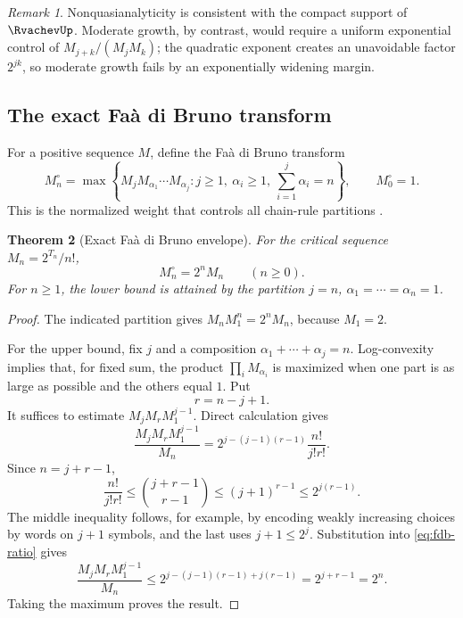 \documentclass[11pt,a4paper]{article}
\newtheorem{theorem}{Theorem}[section]
\theoremstyle{definition}
\theoremstyle{remark}
\newtheorem{remark}[theorem]{Remark}
\begin{document}
\begin{remark}
Nonquasianalyticity is consistent with the compact support of $\RvachevUp$.  Moderate
growth, by contrast, would require a uniform exponential control of
$M_{j+k}/(M_jM_k)$; the quadratic exponent creates an unavoidable factor
$2^{jk}$, so moderate growth fails by an exponentially widening margin.
\end{remark}

\subsection{The exact Fa\`a di Bruno transform}

For a positive sequence $M$, define the Fa\`a di Bruno transform
\begin{equation}
  M_n^\circ=
  \max\left\{
    M_jM_{\alpha_1}\cdots M_{\alpha_j}:
    j\ge1,\ \alpha_i\ge1,\ \sum_{i=1}^j\alpha_i=n
  \right\},
  \qquad M_0^\circ=1.
  \label{eq:fdb-transform-def}
\end{equation}
This is the normalized weight that controls all chain-rule partitions
\cite{RainerSchindl}.

\begin{theorem}[Exact Fa\`a di Bruno envelope]
\label{thm:exact-fdb}
For the critical sequence $M_n=2^{T_n}/n!$,
\begin{equation}
  M_n^\circ=2^nM_n
  \qquad(n\ge0).
  \label{eq:exact-fdb}
\end{equation}
For $n\ge1$, the lower bound is attained by the partition
$j=n$, $\alpha_1=\cdots=\alpha_n=1$.
\end{theorem}

\begin{proof}
The indicated partition gives
$M_nM_1^n=2^nM_n$, because $M_1=2$.

For the upper bound, fix $j$ and a composition
$\alpha_1+\cdots+\alpha_j=n$.  Log-convexity implies that, for fixed sum, the
product $\prod_iM_{\alpha_i}$ is maximized when one part is as large as possible
and the others equal $1$.  Put
\[
  r=n-j+1.
\]
It suffices to estimate $M_jM_rM_1^{j-1}$.  Direct calculation gives
\begin{equation}
 \frac{M_jM_rM_1^{j-1}}{M_n}
 =2^{j-(j-1)(r-1)}\frac{n!}{j!r!}.
 \label{eq:fdb-ratio}
\end{equation}
Since $n=j+r-1$,
\begin{equation}
  \frac{n!}{j!r!}
  \le\binom{j+r-1}{r-1}
  \le(j+1)^{r-1}
  \le2^{j(r-1)}.
  \label{eq:factorial-bound}
\end{equation}
The middle inequality follows, for example, by encoding weakly increasing choices
by words on $j+1$ symbols, and the last uses $j+1\le2^j$.  Substitution into
\eqref{eq:fdb-ratio} gives
\[
 \frac{M_jM_rM_1^{j-1}}{M_n}
 \le2^{j-(j-1)(r-1)+j(r-1)}
 =2^{j+r-1}=2^n.
\]
Taking the maximum proves the result.
\end{proof}
\end{document}
